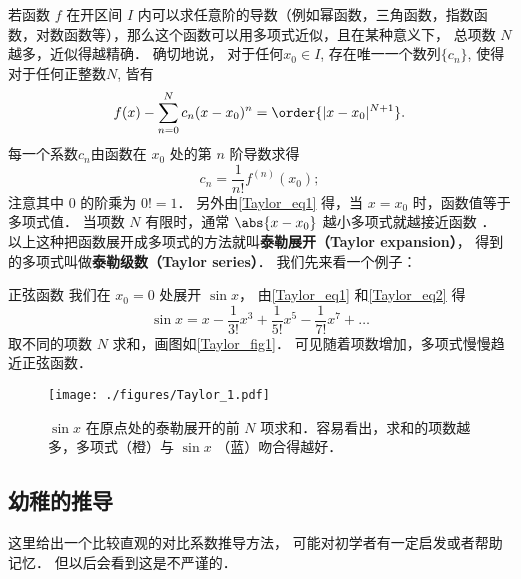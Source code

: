 

若函数 $f$ 在开区间 $I$ 内可以求任意阶的导数（例如幂函数，三角函数，指数函数，对数函数等），那么这个函数可以用多项式近似，且在某种意义下， 总项数 $N$ 越多，近似得越精确． 确切地说， 对于任何$x_0\in I$, 存在唯一一个数列$\{c_n\}$, 使得对于任何正整数$N$, 皆有
\begin{equation}\label{Taylor_eq1}
f(x) -\sum_{n = 0}^N  c_n (x - x_0)^n=\order{|x-x_0|^{N+1}}.
\end{equation}
每一个系数$c_n$由函数在 $x_0$ 处的第 $n$ 阶导数求得
\begin{equation}\label{Taylor_eq2}
c_n = \frac{1}{n!} f^{(n)}(x_0);
\end{equation}
注意其中 0 的阶乘为 $0! = 1$． 另外由\autoref{Taylor_eq1} 得，当 $x=x_0$ 时，函数值等于多项式值． 当项数 $N$ 有限时，通常 $\abs{x-x_0}$ 越小多项式就越接近函数 ． 以上这种把函数展开成多项式的方法就叫\textbf{泰勒展开（Taylor expansion）}， 得到的多项式叫做\textbf{泰勒级数（Taylor series）}． 我们先来看一个例子：

\begin{example}{正弦函数}
我们在 $x_0=0$ 处展开 $\sin x$， 由\autoref{Taylor_eq1} 和\autoref{Taylor_eq2} 得
\begin{equation}\label{Taylor_eq3}
\sin x = x - \frac{1}{3!}{x^3} + \frac{1}{5!}{x^5} - \frac{1}{7!} x^7 + \ldots 
\end{equation}
取不同的项数 $N$ 求和，画图如\autoref{Taylor_fig1}． 可见随着项数增加，多项式慢慢趋近正弦函数．

\begin{figure}[ht]
\centering
\texttt{[image: ./figures/Taylor\_1.pdf]}
\caption{$\sin x$ 在原点处的泰勒展开的前 $N$ 项求和．容易看出，求和的项数越多，多项式（橙）与 $\sin x$ （蓝）吻合得越好．}\label{Taylor_fig1}
\end{figure}
\end{example}

\subsection{幼稚的推导}
这里给出一个比较直观的对比系数推导方法， 可能对初学者有一定启发或者帮助记忆． 但以后会看到这是不严谨的．


